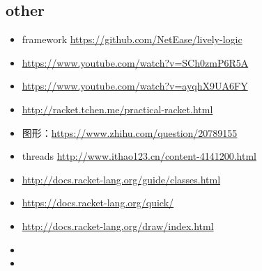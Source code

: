 \documentclass[9pt,b5paper]{article}
\begin{document}
\subsection{other}
\label{sec-3-2}
\begin{itemize}
\item framework \url{https://github.com/NetEase/lively-logic}
\item \url{https://www.youtube.com/watch?v=SCh0zmP6R5A}
\item \url{https://www.youtube.com/watch?v=ayqhX9UA6FY}
\item \url{http://racket.tchen.me/practical-racket.html}
\item 图形：\url{https://www.zhihu.com/question/20789155}
\item threads \url{http://www.ithao123.cn/content-4141200.html}
\item \url{http://docs.racket-lang.org/guide/classes.html}
\item \url{https://docs.racket-lang.org/quick/}
\item \url{http://docs.racket-lang.org/draw/index.html}
\item 
\item 
\end{itemize}
\end{document}
